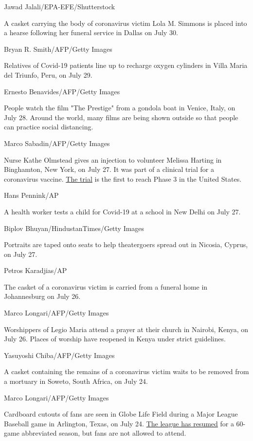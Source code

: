 Jawad Jalali/EPA-EFE/Shutterstock

A casket carrying the body of coronavirus victim Lola M. Simmons is
placed into a hearse following her funeral service in Dallas on July 30.

Bryan R. Smith/AFP/Getty Images

Relatives of Covid-19 patients line up to recharge oxygen cylinders in
Villa Maria del Triunfo, Peru, on July 29.

Ernesto Benavides/AFP/Getty Images

People watch the film "The Prestige" from a gondola boat in Venice,
Italy, on July 28. Around the world, many films are being shown outside
so that people can practice social distancing.

Marco Sabadin/AFP/Getty Images

Nurse Kathe Olmstead gives an injection to volunteer Melissa Harting in
Binghamton, New York, on July 27. It was part of a clinical trial for a
coronavirus vaccine.
\href{https://www.cnn.com/2020/07/27/health/coronavirus-vaccine-trial-begins-moderna-phase-3/index.html}{The
trial} is the first to reach Phase 3 in the United States.

Hans Pennink/AP

A health worker tests a child for Covid-19 at a school in New Delhi on
July 27.

Biplov Bhuyan/HindustanTimes/Getty Images

Portraits are taped onto seats to help theatergoers spread out in
Nicosia, Cyprus, on July 27.

Petros Karadjias/AP

The casket of a coronavirus victim is carried from a funeral home in
Johannesburg on July 26.

Marco Longari/AFP/Getty Images

Worshippers of Legio Maria attend a prayer at their church in Nairobi,
Kenya, on July 26. Places of worship have reopened in Kenya under strict
guidelines.

Yasuyoshi Chiba/AFP/Getty Images

A casket containing the remains of a coronavirus victim waits to be
removed from a mortuary in Soweto, South Africa, on July 24.

Marco Longari/AFP/Getty Images

Cardboard cutouts of fans are seen in Globe Life Field during a Major
League Baseball game in Arlington, Texas, on July 24.
\href{http://www.cnn.com/2020/07/22/us/gallery/baseball-begins-2020/index.html}{The
league has resumed} for a 60-game abbreviated season, but fans are not
allowed to attend.

